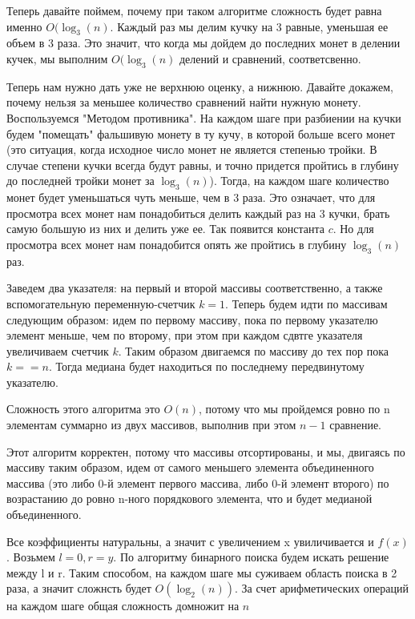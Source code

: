 \documentclass[12pt]{extreport}
\theoremstyle{definition}
\theoremstyle{definition}
\newcounter{problem}
\newcounter{subproblem}
\def\PRSUBskip{
	\medskip
}
\def\prsub{\PRSUBskip\noindent\stepcounter{subproblem}{\sf \thesubproblem .} }
\begin{document}
\prsub Теперь давайте поймем, почему при таком алгоритме сложность будет равна именно $O(\log_3(n)$. Каждый раз мы делим кучку на 3 равные, уменьшая ее объем в 3 раза. Это значит, что когда мы дойдем до последних монет в делении кучек, мы выполним $O(\log_3(n)$ делений и сравнений, соответсвенно.

\Pr \hspace{1mm} Теперь нам нужно дать уже не верхнюю оценку, а нижнюю. Давайте докажем, почему нельзя за меньшее количество сравнений найти нужную монету. Воспользуемся "Методом противника". На каждом шаге при разбиении на кучки будем "помещать" фальшивую монету в ту кучу, в которой больше всего монет (это ситуация, когда исходное число монет не является степенью тройки. В случае степени кучки всегда будут равны, и точно придется пройтись в глубину до последней тройки монет за $\log_3(n)$). Тогда, на каждом шаге количество монет будет уменьшаться чуть меньше, чем в 3 раза. Это означает, что для просмотра всех монет нам понадобиться делить каждый раз на 3 кучки, брать самую большую из них и делить уже ее. Так появится константа $c$. Но для просмотра всех монет нам понадобится опять же пройтись в глубину $\log_3(n)$ раз.

\Pr \hspace{1mm} Заведем два указателя: на первый и второй массивы соответственно, а также вспомогательную переменную-счетчик $k = 1$. Теперь будем идти по массивам следующим образом: идем по первому массиву, пока по первому указателю элемент меньше, чем по второму, при этом при каждом сдвтге указателя увеличиваем счетчик $k$. Таким образом двигаемся по массиву до тех пор пока $k == n$. Тогда медиана будет находиться по последнему передвинутому указателю.

\prsub Сложность этого алгоритма это $O(n)$, потому что мы пройдемся ровно по n элементам суммарно из двух массивов, выполнив при этом $n-1$ сравнение.

\prsub Этот алгоритм корректен, потому что массивы отсортированы, и мы, двигаясь по массиву таким образом, идем от самого меньшего элемента объединенного массива (это либо 0-й элемент первого массива, либо 0-й элемент второго) по возрастанию до ровно n-ного порядкового элемента, что и будет медианой объединенного.

\Pr \hspace{1mm} Все коэффициенты натуральны, а значит с увеличением x увиличивается и $f(x)$. Возьмем $l = 0, r = y$. По алгоритму бинарного поиска будем искать решение между l и r. Таким способом, на каждом шаге мы суживаем область поиска в 2 раза, а значит сложнсть будет $O(\log_2(n))$. За счет арифметических операций на каждом шаге общая сложность домножит на $n$
\end{document}
